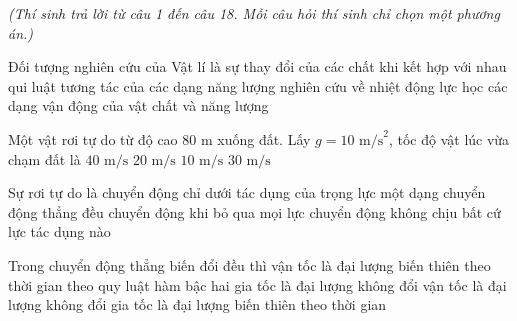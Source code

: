 \begin{flushleft}
	{\color{blue!50!green}}
	\textit{\small (Thí sinh trả lời từ câu 1 đến câu 18. Mỗi câu hỏi thí sinh chỉ chọn một phương án.)}
\end{flushleft}
\setcounter{ex}{0}
\setcounter{bt}{0}

\begin{ex}
	Đối tượng nghiên cứu của Vật lí là
	\choice
	{sự thay đổi của các chất khi kết hợp với nhau}
	{qui luật tương tác của các dạng năng lượng}
	{nghiên cứu về nhiệt động lực học}
	{\True các dạng vận động của vật chất và năng lượng}
\end{ex}

\begin{ex}
	Một vật rơi tự do từ độ cao $80\text{ m}$ xuống đất. Lấy $g = 10\text{ m/s}^2$, tốc độ vật lúc vừa chạm đất là
	\choice
	{\True $40\text{ m/s}$}
	{$20\text{ m/s}$}
	{$10\text{ m/s}$}
	{$30\text{ m/s}$}
\end{ex}

\begin{ex}
	Sự rơi tự do là
	\choice
	{\True chuyển động chỉ dưới tác dụng của trọng lực}
	{một dạng chuyển động thẳng đều}
	{chuyển động khi bỏ qua mọi lực}
	{chuyển động không chịu bất cứ lực tác dụng nào}
\end{ex}

\begin{ex}
	Trong chuyển động thẳng biến đổi đều thì
	\choice
	{vận tốc là đại lượng biến thiên theo thời gian theo quy luật hàm bậc hai}
	{\True gia tốc là đại lượng không đổi}
	{vận tốc là đại lượng không đổi}
	{gia tốc là đại lượng biến thiên theo thời gian}
\end{ex}

